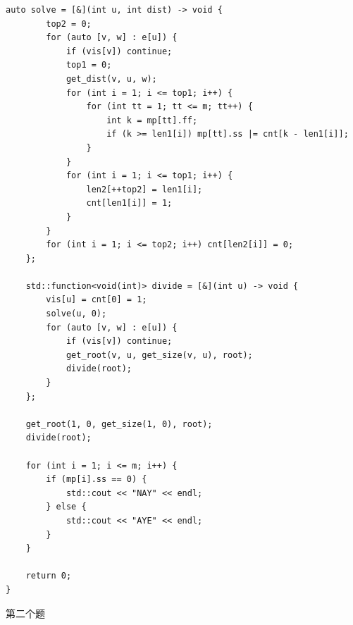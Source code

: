 \documentclass[UTF8, a4paper, titlepage, twoside]{ctexart}
\begin{document}
\begin{lstlisting}[style=cpp]
    auto solve = [&](int u, int dist) -> void {
        top2 = 0;
        for (auto [v, w] : e[u]) {
            if (vis[v]) continue;
            top1 = 0;
            get_dist(v, u, w);
            for (int i = 1; i <= top1; i++) {
                for (int tt = 1; tt <= m; tt++) {
                    int k = mp[tt].ff;
                    if (k >= len1[i]) mp[tt].ss |= cnt[k - len1[i]];
                }
            }
            for (int i = 1; i <= top1; i++) {
                len2[++top2] = len1[i];
                cnt[len1[i]] = 1;
            }
        }
        for (int i = 1; i <= top2; i++) cnt[len2[i]] = 0;
    };

    std::function<void(int)> divide = [&](int u) -> void {
        vis[u] = cnt[0] = 1;
        solve(u, 0);
        for (auto [v, w] : e[u]) {
            if (vis[v]) continue;
            get_root(v, u, get_size(v, u), root);
            divide(root);
        }
    };

    get_root(1, 0, get_size(1, 0), root);
    divide(root);

    for (int i = 1; i <= m; i++) {
        if (mp[i].ss == 0) {
            std::cout << "NAY" << endl;
        } else {
            std::cout << "AYE" << endl;
        }
    }

    return 0;
}
\end{lstlisting}
第二个题
\end{document}
